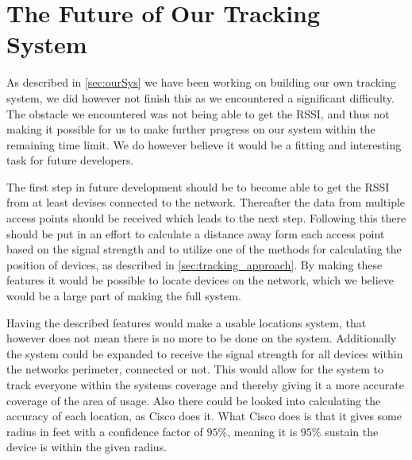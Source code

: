 \section{The Future of Our Tracking System}\label{sec:futureSystem}
As described in \cref{sec:ourSys} we have been working on building our own tracking system, we did however not finish this as we encountered a significant difficulty. The obstacle we encountered was not being able to get the RSSI, and thus not making it possible for us to make further progress on our system within the remaining time limit. We do however believe it would be a fitting and interesting task for future developers.

The first step in future development should be to become able to get the RSSI from at least devises connected to the network. Thereafter the data from multiple access points should be received which leads to the next step. Following this there should be put in an effort to calculate a distance away form each access point based on the signal strength and to utilize one of the methods for calculating the position of devices, as described in \cref{sec:tracking_approach}. By making these features it would be possible to locate devices on the network, which we believe would be a large part of making the full system.

Having the described features would make a usable locations system, that however does not mean there is no more to be done on the system. Additionally the system could be expanded to receive the signal strength for all devices within the networks perimeter, connected or not. This would allow for the system to track everyone within the systems coverage and thereby giving it a more accurate coverage of the area of usage.
Also there could be looked into calculating the accuracy of each location, as Cisco does it. What Cisco does is that it gives some radius in feet with a confidence factor of $95\%$, meaning it is $95\%$ sustain the device is within the given radius\cite{cisco_acc}. 

